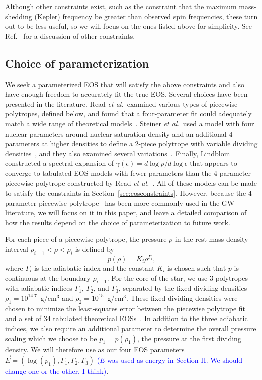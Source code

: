 \documentclass[twocolumn,prd,amssymb,aps,nofootinbib,showpacs,epsf]{revtex4}
\newcommand\les[2]{\textcolor{blue}{{#1}\sout{#2}}}
\begin{document}
Although other constraints exist, such as the constraint that the maximum mass-shedding (Kepler) frequency be greater than observed spin frequencies, these turn out to be less useful, so we will focus on the ones listed above for simplicity. See Ref.~\cite{ReadLackey2009} for a discussion of other constraints.

\subsection{Choice of parameterization}
\label{sec:eosparam}

We seek a parameterized EOS that will satisfy the above constraints and also have enough freedom to accurately fit the true EOS. Several choices have been presented in the literature. Read {\it et al.}\ examined various types of piecewise polytropes, defined below, and found that a four-parameter fit could adequately match a wide range of theoretical models~\cite{ReadLackey2009}. Steiner {\it et al.}\ used a model with four nuclear parameters around nuclear saturation density and an additional 4 parameters at higher densities to define a 2-piece polytrope with variable dividing densities~\cite{SteinerLattimerBrown2010}, and they also examined several variations~\cite{SteinerLattimerBrown2013}. Finally, Lindblom constructed a spectral expansion of $\gamma(\epsilon) = d\log p / d\log \epsilon$ that appears to converge to tabulated EOS models with fewer parameters than the 4-parameter piecewise polytrope constructed by Read {\it et al.}~\cite{Lindblom2010}. All of these models can be made to satisfy the constraints in Section~\ref{sec:eosconstraints}. However, because the 4-parameter piecewise polytrope~\cite{ReadLackey2009} has been more commonly used in the GW literature, we will focus on it in this paper, and leave a detailed comparison of how the results depend on the choice of parameterization to future work.

For each piece of a piecewise polytrope, the pressure $p$ in the rest-mass density interval $\rho_{i-1} < \rho < \rho_i$ is defined by
\begin{equation}
p(\rho) = K_i \rho^{\Gamma_i},
\end{equation}
where $\Gamma_i$ is the adiabatic index and the constant $K_i$ is chosen such that $p$ is continuous at the boundary $\rho_{i-1}$. For the core of the star, we use 3 polytropes with adiabatic indices $\Gamma_1$, $\Gamma_2$, and $\Gamma_3$, separated by the fixed dividing densities $\rho_1 = 10^{14.7}$~g/cm$^3$ and $\rho_2 = 10^{15}$~g/cm$^3$. These fixed dividing densities were chosen to minimize the least-squares error between the piecewise polytrope fit and a set of 34 tabulated theoretical EOSs~\cite{ReadLackey2009}. In addition to the three adiabatic indices, we also require an additional parameter to determine the overall pressure scaling which we choose to be $p_1 = p(\rho_1)$, the pressure at the first dividing density. We will therefore use as our four EOS parameters $\vec E = (\log(p_1), \Gamma_1, \Gamma_2, \Gamma_3)$ \les{($E$ was used as energy in Section II.  We should change one or the other, I think)}{}.
\end{document}
